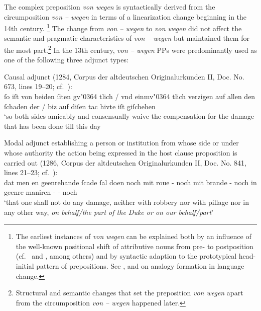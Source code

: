 \documentclass[output=paper
  ,nobabel
  ,draftmode
  ,babelshorthands
  ,colorlinks, citecolor=brown
]{langscibook}
\begin{document}
The complex preposition \emph{von wegen} is syntactically derived from the circumposition \emph{von – wegen} in terms of a linearization change beginning in the 14th century.%
%
\footnote{The earliest instances of \emph{von wegen} can be explained both by an influence of the well-known positional shift of attributive nouns from pre- to postposition (cf.\ \citealp[215–231]{Demske2001a} and \citealp[100–101]{NueblingEtAl2013}, among others) and by syntactic adaption to the prototypical head-initial pattern of  prepositions. See \citet[106–120]{Paul1920}, \citet[404–124]{Bloomfield1933} and \citet[14ff]{Becker1990} on analogy formation in language change.
}
The change from \emph{von – wegen} to \emph{von wegen} did not affect the semantic and pragmatic characteristics of \emph{von – wegen} but maintained them for the most part.\footnote{Structural and semantic changes that set the preposition \emph{von wegen} apart from the circumposition \emph{von – wegen} happened later.}
In the 13th century, \emph{von – wegen} PPs were predominantly used as one of the following three adjunct types:

\enlargethispage{-7pt}
\eanoraggedright\label{ex-causaladj} 
\sloppy
Causal adjunct (1284, Corpus der altdeutschen
Originalurkunden II, Doc. No. 673, lines 19--20; cf.\ \citealp[86]{WilhelmNewald1943}):\\[2pt]%
ſo iſt von beiden ſiten gv\char"0364 tlich / vnd einmv\char"0364 tlich verzigen auf allen den
ſchaden der  / biz auf diſen tac hivte iſt giſchehen\\
`so both sides amicably and consensually waive the compensation for the damage that has been done till this day 
\z


\eanoraggedright\label{ex-modaladj} 
Modal adjunct establishing a person or institution from whose side or  under whose authority the
action being expressed in the host clause proposition is carried out (1286, Corpus der altdeutschen
Originalurkunden II, Doc. No. 841, lines 21--23; cf.\ \citealp[192]{WilhelmNewald1943}):\\[2pt]
	dat men en geenrehande ſcade ſal doen noch mit roue - noch mit brande - noch in geenre maniren -  - noch \\
`that one shall not do any damage, neither with robbery nor with pillage nor in any other way,
\emph{on behalf/the part of the Duke or on our behalf/part}'
\z
\end{document}
